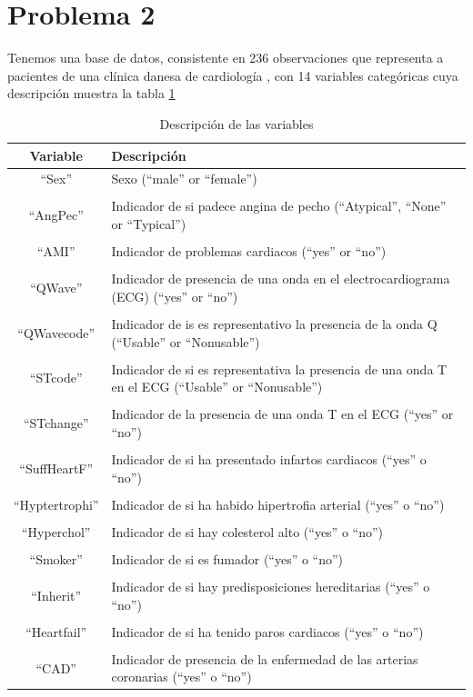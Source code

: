 \documentclass[11pt]{article}
\begin{document}
\section{Problema 2}
Tenemos una base de datos, consistente en 236 observaciones que representa a pacientes de una clínica danesa de cardiología \cite{3-2}, con 14 variables categóricas cuya descripción muestra la tabla \ref{2-desc}
\begin{table}[H]
    \centering
    \begin{tabular}{c|p{8cm}}
        Variable & Descripción \\
        \hline
        ``Sex'' & Sexo (``male'' or ``female'')\\
        & \\
        ``AngPec'' & Indicador de si padece angina de pecho (``Atypical'', ``None'' or ``Typical'') \\
        & \\
        ``AMI'' &  Indicador de problemas cardiacos (``yes'' or ``no'')  \\
        & \\
        ``QWave'' & Indicador de presencia de una onda en el electrocardiograma (ECG) (``yes'' or ``no'')  \\
        & \\
        ``QWavecode'' & Indicador de is es representativo la presencia de la onda Q (``Usable'' or ``Nonusable'')  \\
        & \\
        ``STcode'' & Indicador de si es representativa la presencia de una onda T en el ECG (``Usable'' or ``Nonusable'') \\
        & \\
        ``STchange'' & Indicador de la presencia de una onda T en el ECG (``yes'' or ``no'') \\
        & \\
        ``SuffHeartF'' & Indicador de si ha presentado infartos cardiacos (``yes'' o ``no'') \\
        & \\
        ``Hyptertrophi'' & Indicador de si ha habido hipertrofia arterial (``yes'' o ``no'') \\
        & \\
        ``Hyperchol'' & Indicador de si hay colesterol alto (``yes'' o ``no'') \\
        & \\
        ``Smoker'' & Indicador de si es fumador (``yes'' o ``no'') \\
        & \\
        ``Inherit'' & Indicador de si hay predisposiciones hereditarias (``yes'' o ``no'') \\
        & \\
        ``Heartfail'' & Indicador de si ha tenido paros cardiacos (``yes'' o ``no'') \\
        & \\
        ``CAD'' & Indicador de presencia de la enfermedad de las arterias coronarias (``yes'' o ``no'') \\
    \end{tabular}
    \caption{Descripción de las variables}
    \label{2-desc}
\end{table}
\end{document}
